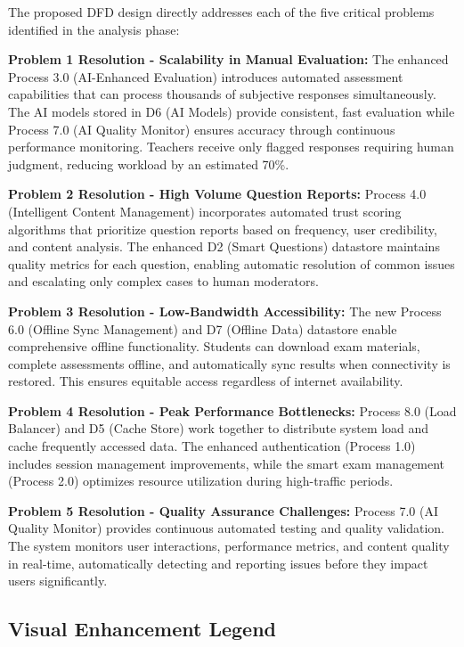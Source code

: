\documentclass[12pt,a4paper,oneside]{book}
\begin{document}
The proposed DFD design directly addresses each of the five critical problems identified in the analysis phase:

\textbf{Problem 1 Resolution - Scalability in Manual Evaluation:}
The enhanced Process 3.0 (AI-Enhanced Evaluation) introduces automated assessment capabilities that can process thousands of subjective responses simultaneously. The AI models stored in D6 (AI Models) provide consistent, fast evaluation while Process 7.0 (AI Quality Monitor) ensures accuracy through continuous performance monitoring. Teachers receive only flagged responses requiring human judgment, reducing workload by an estimated 70\%.

\textbf{Problem 2 Resolution - High Volume Question Reports:}
Process 4.0 (Intelligent Content Management) incorporates automated trust scoring algorithms that prioritize question reports based on frequency, user credibility, and content analysis. The enhanced D2 (Smart Questions) datastore maintains quality metrics for each question, enabling automatic resolution of common issues and escalating only complex cases to human moderators.

\textbf{Problem 3 Resolution - Low-Bandwidth Accessibility:}
The new Process 6.0 (Offline Sync Management) and D7 (Offline Data) datastore enable comprehensive offline functionality. Students can download exam materials, complete assessments offline, and automatically sync results when connectivity is restored. This ensures equitable access regardless of internet availability.

\textbf{Problem 4 Resolution - Peak Performance Bottlenecks:}
Process 8.0 (Load Balancer) and D5 (Cache Store) work together to distribute system load and cache frequently accessed data. The enhanced authentication (Process 1.0) includes session management improvements, while the smart exam management (Process 2.0) optimizes resource utilization during high-traffic periods.

\textbf{Problem 5 Resolution - Quality Assurance Challenges:}
Process 7.0 (AI Quality Monitor) provides continuous automated testing and quality validation. The system monitors user interactions, performance metrics, and content quality in real-time, automatically detecting and reporting issues before they impact users significantly.

\subsection{Visual Enhancement Legend}
\end{document}
